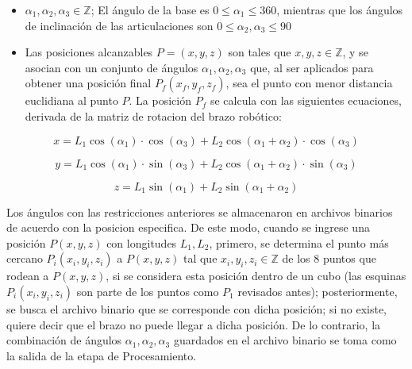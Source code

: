 \begin{itemize} 
	
	\item $\alpha_1, \alpha_2, \alpha_3 \in \mathbb{Z}$; El ángulo de la base es $ 0 \leq \alpha_1 \leq 360$, mientras que los ángulos de inclinación de las articulaciones son $ 0 \leq \alpha_2, \alpha_3 \leq 90$
	
	\item Las posiciones alcanzables $P = (x, y, z)$ son tales que $x,y,z \in \mathbb{Z}$, y se asocian con un conjunto de ángulos $\alpha_1, \alpha_2, \alpha_3$ que, al ser aplicados para obtener una posición final $P_f(x_f,y_f,z_f)$, sea el punto con menor distancia euclidiana al punto $P$. La posición $P_f$ se calcula con las siguientes ecuaciones, derivada de la matriz de rotacion del brazo robótico:
	
\end{itemize}




\begin{equation}
	x = L_1 \cos(\alpha_1) \cdot \cos(\alpha_3) + L_2 \cos(\alpha_1 + \alpha_2) \cdot \cos(\alpha_3)
\end{equation}

\begin{equation}
	y = L_1 \cos(\alpha_1) \cdot \sin(\alpha_3) + L_2 \cos(\alpha_1 + \alpha_2) \cdot \sin(\alpha_3)
\end{equation}

\begin{equation}
	z = L_1 \sin(\alpha_1) + L_2 \sin(\alpha_1 + \alpha_2)
\end{equation}

Los ángulos con las restricciones anteriores se almacenaron en archivos binarios de acuerdo con la posicion especifica. De este modo, cuando se ingrese una posición $P(x,y,z)$ con longitudes $L_1, L_2$, primero, se determina el punto más cercano $P_i(x_i,y_i,z_i)$ a $P(x,y,z)$ tal que $x_i,y_i,z_i \in \mathbb{Z}$ de los 8 puntos que rodean a $P(x,y,z)$, si se considera esta posición dentro de un cubo (las esquinas $P_i(x_i,y_i,z_i)$ son parte de los puntos como $P_1$ revisados antes); posteriormente, se busca el archivo binario que se corresponde con dicha posición; si no existe, quiere decir que el brazo no puede llegar a dicha posición. De lo contrario, la combinación de ángulos $\alpha_1, \alpha_2, \alpha_3$ guardados en el archivo binario se toma como la salida de la etapa de Procesamiento.